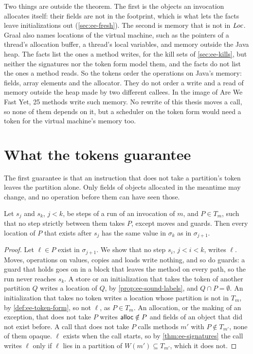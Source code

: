 Two things are outside the theorem. The first is the objects an invocation
allocates itself: their fields are not in the footprint, which is what lets the
facts leave initializations out (\cref{sec:ee-fresh}). The second is memory that
is not in $\mathit{Loc}$. Graal also names locations of the virtual machine, such as the
pointers of a thread's allocation buffer, a thread's local variables, and
memory outside the Java heap. The facts list the ones a method writes, for the
kill sets of \cref{sec:ee-kills}, but neither the signatures nor the token form
model them, and the facts do not list the ones a method reads. So the tokens
order the operations on Java's memory: fields, array elements and the
allocator. They do not order a write and a read of memory outside the heap made
by two different callees. In the image of Are We Fast Yet, 25 methods write
such memory. No rewrite of this thesis moves a call, so none of them depends
on it, but a scheduler on the token form would need a token for the virtual
machine's memory too.

\section{What the tokens guarantee}\label{sec:ee-guarantee}

The first guarantee is that an instruction that does not take a partition's
token leaves the partition alone. Only fields of objects allocated in the
meantime may change, and no operation before them can have seen those.

\begin{lemma}[Frame]\label{lem:ee-frame}
Let $s_j$ and $s_k$, $j < k$, be steps of a run of an invocation of $m$, and
$P \in T_m$, such that no step strictly between them takes $P$, except moves
and guards. Then every location of $P$ that exists after $s_j$ has the same
value in $\sigma_k$ as in $\sigma_{j+1}$.
\end{lemma}

\begin{proof}
Let $\ell \in P$ exist in $\sigma_{j+1}$. We show that no step $s_i$,
$j < i < k$, writes $\ell$. Moves, operations on values, copies and loads write
nothing, and so do guards: a guard that holds goes on in a block that leaves
the method on every path, so the run never reaches $s_k$. A store or an initialization that takes the token of
another partition $Q$ writes a location of $Q$, by \cref{prop:ee-sound-labels},
and $Q \cap P = \emptyset$. An initialization that takes no token writes a
location whose partition is not in $T_m$, by \cref{def:ee-token-form}, so not
$\ell$, as $P \in T_m$. An allocation, or the making of an exception, that does not
take $P$ writes $\mathsf{alloc} \notin P$ and fields of an object that did not exist
before. A call that
does not take $P$ calls methods $m'$ with $P \notin T_{m'}$, none of them
opaque. $\ell$ exists when the call starts, so by \cref{thm:ee-signatures} the
call writes $\ell$ only if $\ell$ lies in a partition of
$W(m') \subseteq T_{m'}$, which it does not.
\end{proof}

